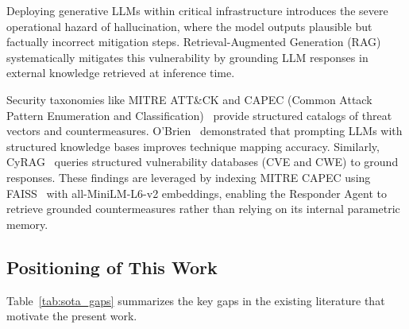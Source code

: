 \documentclass[conference]{IEEEtran}
\begin{document}
Deploying generative LLMs within critical infrastructure introduces the severe operational hazard of hallucination, where the model outputs plausible but factually incorrect mitigation steps. Retrieval-Augmented Generation (RAG)~\cite{lewis2020rag} systematically mitigates this vulnerability by grounding LLM responses in external knowledge retrieved at inference time.

Security taxonomies like MITRE ATT\&CK and CAPEC (Common Attack Pattern Enumeration and Classification)~\cite{mitre_capec} provide structured catalogs of threat vectors and countermeasures. O'Brien~\cite{obrien2024mitre} demonstrated that prompting LLMs with structured knowledge bases improves technique mapping accuracy. Similarly, CyRAG~\cite{ragcyberdefense2025} queries structured vulnerability databases (CVE and CWE) to ground responses. These findings are leveraged by indexing MITRE CAPEC using FAISS~\cite{johnson2019faiss} with all-MiniLM-L6-v2 embeddings, enabling the Responder Agent to retrieve grounded countermeasures rather than relying on its internal parametric memory.

\subsection{Positioning of This Work}

Table~\ref{tab:sota_gaps} summarizes the key gaps in the existing literature that motivate the present work.
\end{document}
